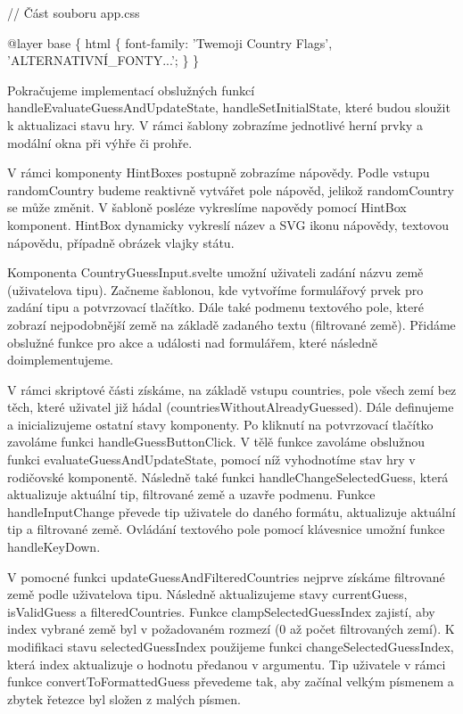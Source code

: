 \begin{prog}
// Část souboru app.css

@layer base \{
  html \{
    font-family: 'Twemoji Country Flags', 'ALTERNATIVNÍ_FONTY...';
  \}
\}
\end{prog}

Pokračujeme implementací obslužných funkcí handleEvaluateGuessAndUpdateState, handleSetInitialState, které budou sloužit k aktualizaci stavu hry. V rámci šablony zobrazíme jednotlivé herní prvky a modální okna při výhře či prohře.

V rámci komponenty HintBoxes postupně zobrazíme nápovědy. Podle vstupu randomCountry budeme reaktivně vytvářet pole nápověd, jelikož randomCountry se může změnit. 
V šabloně posléze vykreslíme napovědy pomocí HintBox komponent. HintBox dynamicky vykreslí název a SVG ikonu nápovědy, textovou nápovědu, případně obrázek vlajky státu.

Komponenta CountryGuessInput.svelte umožní uživateli zadání názvu země (uživatelova tipu). Začneme šablonou, kde vytvoříme formulářový prvek pro zadání tipu a potvrzovací tlačítko. 
Dále také podmenu textového pole, které zobrazí nejpodobnější země na základě zadaného textu (filtrované země). Přidáme obslužné funkce pro akce a události nad formulářem, které následně doimplementujeme.

V rámci skriptové části získáme, na základě vstupu countries, pole všech zemí bez těch, které uživatel již hádal (countriesWithoutAlreadyGuessed). Dále definujeme a inicializujeme ostatní stavy komponenty. 
Po kliknutí na potvrzovací tlačítko zavoláme funkci handleGuessButtonClick. V tělě funkce zavoláme obslužnou funkci evaluateGuessAndUpdateState, pomocí níž vyhodnotíme stav hry v rodičovské komponentě. 
Následně také funkci handleChangeSelectedGuess, která aktualizuje aktuální tip, filtrované země a uzavře podmenu. Funkce handleInputChange převede tip uživatele do daného formátu, aktualizuje aktuální tip a filtrované země. 
Ovládání textového pole pomocí klávesnice umožní funkce handleKeyDown.

V pomocné funkci updateGuessAndFilteredCountries nejprve získáme filtrované země podle uživatelova tipu. Následně aktualizujeme stavy currentGuess, isValidGuess a filteredCountries. 
Funkce clampSelectedGuessIndex zajistí, aby index vybrané země byl v požadovaném rozmezí (0 až počet filtrovaných zemí). 
K modifikaci stavu selectedGuessIndex použijeme funkci changeSelectedGuessIndex, která index aktualizuje o hodnotu předanou v argumentu. 
Tip uživatele v rámci funkce convertToFormattedGuess převedeme tak, aby začínal velkým písmenem a zbytek řetezce byl složen z malých písmen.


